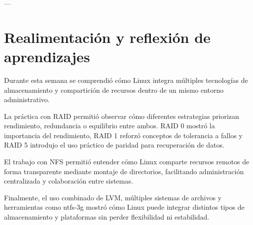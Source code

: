 \documentclass[11pt, letterpaper]{article}
\begin{document}
---
\section{Realimentación y reflexión de aprendizajes}
\label{sec:org5a5319f}

Durante esta semana se comprendió cómo Linux integra múltiples tecnologías de almacenamiento y compartición de recursos dentro de un mismo entorno administrativo.

La práctica con RAID permitió observar cómo diferentes estrategias priorizan rendimiento, redundancia o equilibrio entre ambos. RAID 0 mostró la importancia del rendimiento, RAID 1 reforzó conceptos de tolerancia a fallos y RAID 5 introdujo el uso práctico de paridad para recuperación de datos.

El trabajo con NFS permitió entender cómo Linux comparte recursos remotos de forma transparente mediante montaje de directorios, facilitando administración centralizada y colaboración entre sistemas.

Finalmente, el uso combinado de LVM, múltiples sistemas de archivos y herramientas como ntfs-3g mostró cómo Linux puede integrar distintos tipos de almacenamiento y plataformas sin perder flexibilidad ni estabilidad.
\end{document}
